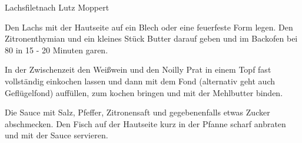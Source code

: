 \begin{recipe}{Lachsfilet}{nach Lutz Moppert}
  \label{Lachsfilet}
  \inglist

  \steps
  Den Lachs mit der Hautseite auf ein Blech oder eine feuerfeste Form legen. Den Zitronenthymian und ein kleines Stück Butter darauf geben und im Backofen bei 80 \celsius in 15 - 20 Minuten garen.

  In der Zwischenzeit den Weißwein und den Noilly Prat in einem Topf fast vollständig einkochen lassen und dann mit dem Fond (alternativ geht auch Geflügelfond) auffüllen, zum kochen bringen und mit der Mehlbutter binden.

  Die Sauce mit Salz, Pfeffer, Zitronensaft und gegebenenfalls etwas Zucker abschmecken.
  Den Fisch auf der Hautseite kurz in der Pfanne scharf anbraten und mit der Sauce servieren.
\end{recipe}
